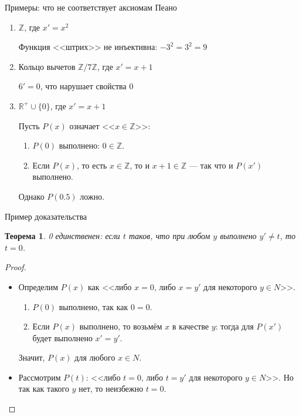 \documentclass[aspectratio=169]{beamer}
\newtheorem{thm}{Теорема}[section]
\begin{document}
\begin{frame}{Примеры: что не соответствует аксиомам Пеано}
\begin{enumerate}
\item $\mathbb{Z}$, где $x' = x^2$\\\pause

Функция <<штрих>> не инъективна: $-3^2 = 3^2 = 9$\pause

\item Кольцо вычетов $\mathbb{Z}/{7\mathbb{Z}}$, где $x' = x+1$\\\pause

$6' = 0$, что нарушает свойства $0$\pause

\item $\mathbb{R^+}\cup\{0\}$, где $x' = x+1$\\\pause

Пусть $P(x)$ означает <<$x \in \mathbb{Z}$>>:\pause \begin{enumerate}
\item $P(0)$ выполнено: $0 \in \mathbb{Z}$.\pause
\item Если $P(x)$, то есть $x \in \mathbb{Z}$, то и $x+1 \in \mathbb{Z}$ --- так
что и $P(x')$ выполнено.\pause
\end{enumerate}
Однако $P(0.5)$ ложно.
\end{enumerate}
\end{frame}

\begin{frame}{Пример доказательства}
\begin{thm}0 единственен: если $t$ таков, что при любом $y$ 
выполнено $y' \ne t$, то $t = 0$.
\end{thm}\pause
\begin{proof}

\begin{itemize}
\item Определим $P(x)$ как <<либо $x = 0$, либо $x = y'$ для некоторого $y \in N$>>.\pause
\begin{enumerate}
\item $P(0)$ выполнено, так как $0 = 0$.\pause
\item Если $P(x)$ выполнено, то возьмём $x$ в качестве $y$: тогда для $P(x')$
будет выполнено $x' = y'$.\pause
\end{enumerate}
Значит, $P(x)$ для любого $x \in N$.\pause

\item Рассмотрим $P(t)$: <<либо $t = 0$, либо $t = y'$ для некоторого $y \in N$>>.
Но так как такого $y$ нет, то неизбежно $t = 0$.
\end{itemize}
\end{proof}
\end{frame}
\end{document}
